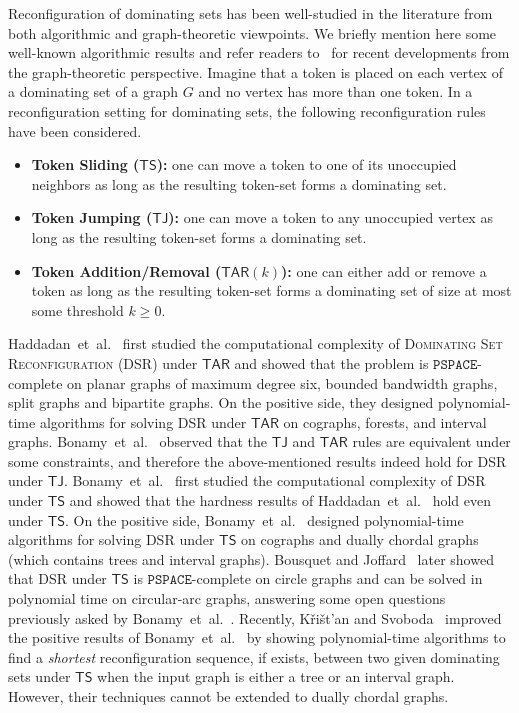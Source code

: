 \documentclass[a4paper]{article}
\theoremstyle{plain}
\theoremstyle{definition}
\newcommand{\sfTS}{{\mathsf{TS}}} %
\newcommand{\sfTJ}{{\mathsf{TJ}}} %
\newcommand{\sfTAR}{{\mathsf{TAR}}} %
\newcommand{\ttPSPACE}{{\mathtt{PSPACE}}}
\begin{document}
Reconfiguration of dominating sets has been well-studied in the literature from both algorithmic and graph-theoretic viewpoints.
We briefly mention here some well-known algorithmic results and refer readers to~\cite{MynhardtN19} for recent developments from the graph-theoretic perspective.
Imagine that a token is placed on each vertex of a dominating set of a graph $G$ and no vertex has more than one token.
In a reconfiguration setting for dominating sets, the following reconfiguration rules have been considered.
\begin{itemize}
	\item \textbf{Token Sliding ($\sfTS$):} one can move a token to one of its unoccupied neighbors as long as the resulting token-set forms a dominating set.
	\item \textbf{Token Jumping ($\sfTJ$):} one can move a token to any unoccupied vertex as long as the resulting token-set forms a dominating set.
	\item \textbf{Token Addition/Removal ($\sfTAR(k)$):} one can either add or remove a token as long as the resulting token-set forms a dominating set of size at most some threshold $k \geq 0$.
\end{itemize}
Haddadan~et~al.~\cite{HaddadanIMNOST16} first studied the computational complexity of \textsc{Dominating Set Reconfiguration (DSR)} under $\sfTAR$ and showed that the problem is $\ttPSPACE$-complete on planar graphs of maximum degree six, bounded bandwidth graphs, split graphs and bipartite graphs.
On the positive side, they designed polynomial-time algorithms for solving \textsc{DSR} under $\sfTAR$ on cographs, forests, and interval graphs.
Bonamy~et~al.~\cite{BonamyDO21} observed that the $\sfTJ$ and $\sfTAR$ rules are equivalent under some constraints, and therefore the above-mentioned results indeed hold for \textsc{DSR} under $\sfTJ$.
Bonamy~et~al.~\cite{BonamyDO21} first studied the computational complexity of \textsc{DSR} under $\sfTS$ and showed that the hardness results of Haddadan~et~al.~\cite{HaddadanIMNOST16} hold even under $\sfTS$.
On the positive side, Bonamy~et~al.~\cite{BonamyDO21} designed polynomial-time algorithms for solving \textsc{DSR} under $\sfTS$ on cographs and dually chordal graphs (which contains trees and interval graphs).
Bousquet and Joffard~\cite{BousquetJ21} later showed that \textsc{DSR} under $\sfTS$ is $\ttPSPACE$-complete on circle graphs and can be solved in polynomial time on circular-arc graphs, answering some open questions previously asked by Bonamy~et~al.~\cite{BonamyDO21}.
Recently, K\v{r}i\v{s}t'an and Svoboda~\cite{KristanS23} improved the positive results of Bonamy~et~al.~\cite{BonamyDO21} by showing polynomial-time algorithms to find a \textit{shortest} reconfiguration sequence, if exists, between two given dominating sets under $\sfTS$ when the input graph is either a tree or an interval graph.
However, their techniques cannot be extended to dually chordal graphs.
\end{document}
